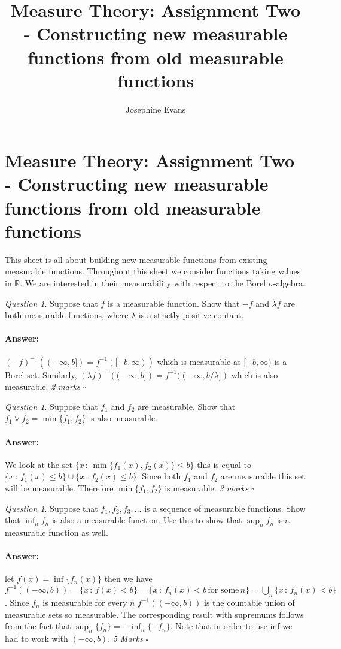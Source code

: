 \documentclass[11pt]{article}
\author{
Josephine Evans
}
\title{Measure Theory: Assignment Two - Constructing new measurable functions from old measurable functions}
\theoremstyle{definition}
\theoremstyle{remark}
\newtheorem{q}[thm]{Question}
\newenvironment{ans}{\paragraph{Answer:}}{\hfill$\square$ \vspace{20pt}}
\begin{document}
\section{Measure Theory: Assignment Two - Constructing new measurable functions from old measurable functions}
This sheet is all about building new measurable functions from existing measurable functions. Throughout this sheet we consider functions taking values in $\mathbb{R}$. We are interested in their measurability with respect to the Borel $\sigma$-algebra.
\begin{q}
Suppose that $f$ is a measurable function. Show that $-f$ and $\lambda f$ are both measurable functions, where $\lambda$ is a strictly positive contant.
\end{q}
\begin{ans}
$(-f)^{-1}((-\infty, b]) = f^{-1}([-b, \infty))$ which is measurable as $[-b, \infty)$ is a Borel set. Similarly, $(\lambda f)^{-1}((-\infty, b]) = f^{-1}((-\infty, b/\lambda])$ which is also measurable. \emph{2 marks}
\end{ans}


\begin{q}
Suppose that $f_1$ and $f_2$ are measurable. Show that $f_1 \vee f_2 = \min\{f_1, f_2\}$ is also measurable.
\end{q}
\begin{ans}
We look at the set $\{ x \,:\, \min\{ f_1(x), f_2(x)\} \leq b\}$ this is equal to $\{ x \,:\, f_1(x) \leq b\} \cup \{ x \,:\, f_2(x) \leq b\}$. Since both $f_1$ and $f_2$ are measurable this set will be measurable. Therefore $\min\{f_1, f_2\}$ is measurable. \emph{3 marks}
\end{ans}

\begin{q}
Suppose that $f_1, f_2, f_3, \dots$ is a sequence of measurable functions. Show that $\inf_n f_n$ is also a measurable function. Use this to show that $\sup_n f_n$ is a measurable function as well.
\end{q}
\begin{ans}
let $f(x) = \inf\{f_n(x)\}$ then we have $f^{-1}((-\infty, b)) = \{ x \,:\, f(x) < b\} = \{ x \, :\, f_n(x) < b \, \mbox{for some} \, n\} = \bigcup_n \{ x \,:\, f_n(x) < b\}$. Since $f_n$ is measurable for every $n$ $f^{-1}((-\infty,b))$ is the countable union of measurable sets so measurable. The corresponding result with supremums follows from the fact that $\sup_n \{ f_n \} = - \inf_n \{ -f_n\}$. Note that in order to use inf we had to work with $(-\infty, b)$. \emph{5 Marks}
\end{ans}
\end{document}
